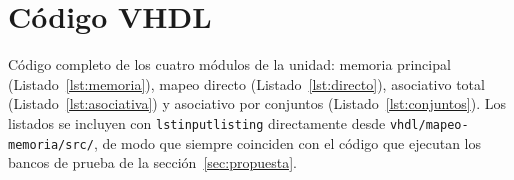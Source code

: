 \documentclass[llncs]{llncs}
\begin{document}



\appendix
\section{Código VHDL}
\label{app:codigo}

Código completo de los cuatro módulos de la unidad: memoria principal
(Listado~\ref{lst:memoria}), mapeo directo (Listado~\ref{lst:directo}),
asociativo total (Listado~\ref{lst:asociativa}) y asociativo por
conjuntos (Listado~\ref{lst:conjuntos}). Los listados se incluyen con
\texttt{lstinputlisting} directamente desde
\texttt{vhdl/\allowbreak mapeo-\allowbreak memoria/\allowbreak src/},
de modo que siempre coinciden con el código que ejecutan los bancos de
prueba de la sección~\ref{sec:propuesta}.








\end{document}
